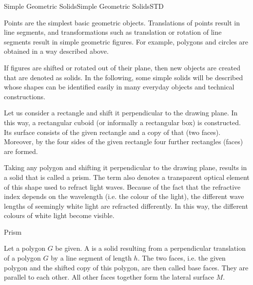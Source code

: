 \begin{MXContent}{Simple Geometric Solids}{Simple Geometric Solids}{STD}%

Points are the simplest basic geometric objects. Translations of points result in
line segments, and transformations such as translation or rotation of 
line segments result in simple geometric figures. For example, polygons and circles 
are obtained in a way described above. 

If figures are shifted or rotated out of their plane, then new objects are 
created that are denoted as solids. In the following, some simple solids 
will be described whose shapes can be identified easily in many everyday objects 
and technical constructions.

\begin{MExample}
Let us consider a rectangle and shift it perpendicular to the drawing plane.
In this way, a rectangular cuboid (or informally a rectangular box) is constructed. 
Its surface consists of the given rectangle and a copy of that (two faces). Moreover, 
by the four sides of the given rectangle four further rectangles (faces) are formed.
\end{MExample}

Taking any polygon and shifting it perpendicular to the drawing plane, results in a solid 
that is called a prism. The term also denotes a transparent optical element 
of this shape used to refract light waves. Because of the fact that the refractive index
depends on the wavelength (i.e. the colour of the light), the different wave lengths of seemingly white 
light are refracted differently. In this way, the different colours of white light become visible.

\begin{MXInfo}{Prism}

Let a polygon $G$ be given. A  is a solid resulting from 
a perpendicular translation of a polygon $G$ by a line segment of length $h$.
The two faces, i.e. the given polygon and the shifted copy of this polygon,
are then called base faces. They are parallel to each other. All other 
faces together form the lateral surface $M$.


\end{MXInfo}
\end{MXContent}
